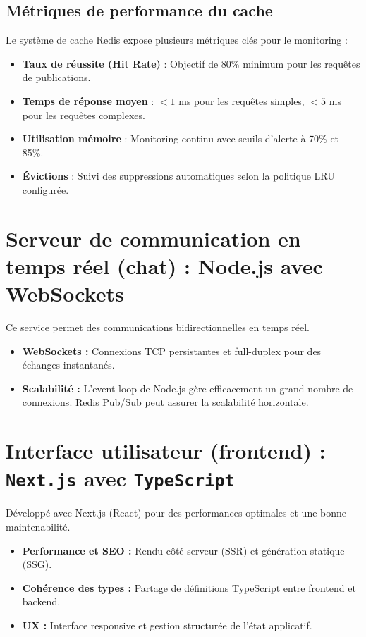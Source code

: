 \documentclass{rapportPfe}
\begin{document}
\subsection{Métriques de performance du cache}

Le système de cache Redis expose plusieurs métriques clés pour le monitoring :

\begin{itemize}
    \item \textbf{Taux de réussite (Hit Rate)} : Objectif de 80\% minimum pour les requêtes de publications.
    \item \textbf{Temps de réponse moyen} : $< 1$ ms pour les requêtes simples, $< 5$ ms pour les requêtes complexes.
    \item \textbf{Utilisation mémoire} : Monitoring continu avec seuils d'alerte à 70\% et 85\%.
    \item \textbf{Évictions} : Suivi des suppressions automatiques selon la politique LRU configurée.
\end{itemize}

\section{Serveur de communication en temps réel (chat) : Node.js avec WebSockets}

Ce service permet des communications bidirectionnelles en temps réel.

\begin{itemize}
    \item \textbf{WebSockets :} Connexions TCP persistantes et full-duplex pour des échanges instantanés.
    \item \textbf{Scalabilité :} L’event loop de Node.js gère efficacement un grand nombre de connexions. Redis Pub/Sub peut assurer la scalabilité horizontale.
\end{itemize}

\section{Interface utilisateur (frontend) : \texttt{Next.js} avec \texttt{TypeScript}}

Développé avec Next.js (React) pour des performances optimales et une bonne maintenabilité.

\begin{itemize}
    \item \textbf{Performance et SEO :} Rendu côté serveur (SSR) et génération statique (SSG).
    \item \textbf{Cohérence des types :} Partage de définitions TypeScript entre frontend et backend.
    \item \textbf{UX :} Interface responsive et gestion structurée de l’état applicatif.
\end{itemize}
\end{document}
